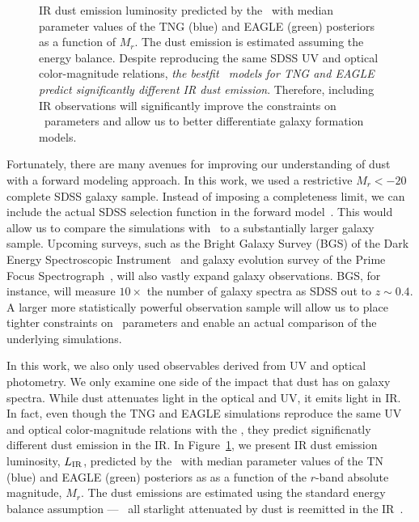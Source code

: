 \begin{figure}
\begin{center}
    \caption{\label{fig:lir}
    IR dust emission luminosity predicted by the \eda~with median parameter
    values of the TNG (blue) and EAGLE (green) posteriors as a function of
    $M_r$. The dust emission is estimated assuming the \cite{dacunha2008}
    energy balance.  Despite reproducing the same SDSS UV and optical
    color-magnitude relations, \emph{the bestfit \eda~models for TNG and EAGLE
    predict significantly different IR dust emission}. Therefore, including IR
    observations will significantly improve the constraints on \eda~parameters
    and allow us to better differentiate galaxy formation models.
    }
\end{center}
\end{figure}

Fortunately, there are many avenues for improving our understanding of dust
with a forward modeling approach. In this work, we used a restrictive $M_r <
-20$ complete SDSS galaxy sample. Instead of imposing a completeness limit, 
we can include the actual SDSS selection function in the forward 
model~\citep[\eg~][]{dickey2020}. This would allow us to compare the
simulations with \eda~to a substantially larger galaxy sample. Upcoming
surveys, such as the Bright Galaxy Survey (BGS) of the Dark Energy
Spectroscopic Instrument~\citep[DESI;][]{desicollaboration2016, ruiz-macias2020} 
and galaxy evolution survey of the Prime Focus
Spectrograph~\citep[PFS;][]{takada2014,tamura2016}, will also vastly expand galaxy
observations. BGS, for instance, will measure $10\times$ the number of galaxy
spectra as SDSS out to $z\sim0.4$. A larger more statistically
powerful observation sample will allow us to place tighter constraints on \eda~parameters
and enable an actual comparison of the underlying simulations. 

In this work, we also only used observables derived from UV and optical
photometry. We only examine one side of the impact that dust has on galaxy
spectra. While dust attenuates light in the optical and UV, it emits light in
IR. In fact, even though the TNG and EAGLE simulations reproduce the same UV and
optical color-magnitude relations with the \eda, they predict significnatly 
different dust emission in the IR. In Figure~\ref{fig:lir}, we present IR dust
emission luminosity, $L_{\rm IR}$, predicted by the \eda~with median parameter values of 
the TN (blue) and EAGLE (green) posteriors as as a function of the $r$-band 
absolute magnitude, $M_r$. The dust emissions are estimated using the standard
energy balance assumption --- \ie~all starlight attenuated by dust is reemitted 
in the IR~\citep{dacunha2008}. 

